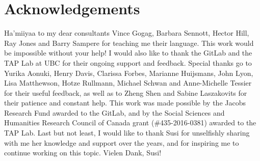 \documentclass[output=paper]{langscibook}
\begin{document}
\section*{Acknowledgements}
Ha’miiyaa to my dear consultants Vince Gogag, Barbara Sennott, Hector Hill, Ray Jones and Barry Sampere for teaching me their language. This work would be impossible without your help! I would also like to thank the GitLab and the TAP Lab at UBC for their ongoing support and feedback. Special thanks go to Yurika Aonuki, Henry Davis, Clarissa Forbes, Marianne Huijsmans, John Lyon, Lisa Matthewson, Hotze Rullmann, Michael Schwan and Anne-Michelle Tessier for their useful feedback, as well as to Zheng Shen and Sabine Laszakovits for their patience and constant help. This work was made possible by the Jacobs Research Fund awarded to the GitLab, and by the Social Sciences and Humanities Research Council of Canada grant (\#435-2016-0381) awarded to the TAP Lab. Last but not least, I would like to thank Susi for unselfishly sharing with me her knowledge and support over the years, and for inspiring me to continue working on this topic. Vielen Dank, Susi!
\end{document}
